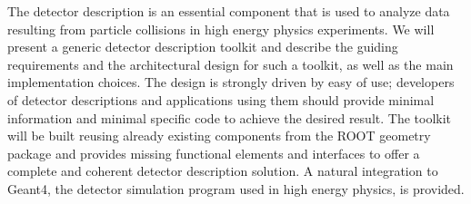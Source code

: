 \noindent
The detector description is an essential component that is used to analyze data
resulting from particle collisions in high energy physics experiments.
We will present a generic detector description toolkit
and describe the guiding requirements and the architectural design for
such a toolkit, as well as the main implementation choices.
The design is strongly driven by easy of use;
developers of detector descriptions and applications using
them should provide minimal information and minimal specific
code to achieve the desired result.
The toolkit will be built reusing already existing components
from the ROOT geometry package and provides missing functional
elements and interfaces to offer a complete and coherent
detector description solution. A natural integration to
Geant4, the detector simulation program used in high energy physics,
is provided.
